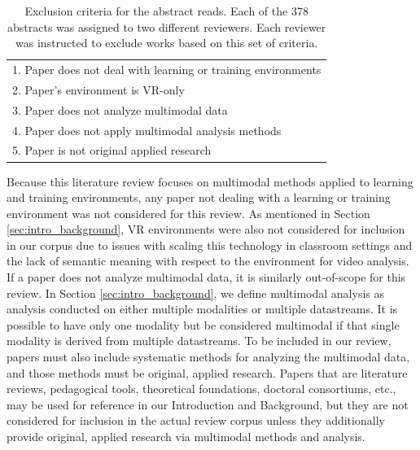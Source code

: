 \documentclass[manuscript,screen,review]{acmart}
\begin{document}
\begin{table}[htbp]
    \renewcommand{\arraystretch}{1.3}%
    \centering
    \caption{Exclusion criteria for the abstract reads. Each of the 378 abstracts was assigned to two different reviewers. Each reviewer was instructed to exclude works based on this set of criteria.}
    \begin{tabularx}{\linewidth}{l@{\hskip .25in}}
        \midrule
        1. Paper does not deal with learning or training environments \\
        2. Paper's environment is VR-only \\
        3. Paper does not analyze multimodal data \\
        4. Paper does not apply multimodal analysis methods \\
        5. Paper is not original applied research\\
        \bottomrule
    \end{tabularx}
    \label{tab:abstract_exclusion_criteria}
\end{table}

Because this literature review focuses on multimodal methods applied to learning and training environments, any paper not dealing with a learning or training environment was not considered for this review. As mentioned in Section \ref{sec:intro_background}, VR environments were also not considered for inclusion in our corpus due to issues with scaling this technology in classroom settings and the lack of semantic meaning with respect to the environment for video analysis. If a paper does not analyze multimodal data, it is similarly out-of-scope for this review. In Section \ref{sec:intro_background}, we define multimodal analysis as analysis conducted on either multiple modalities or multiple datastreams. It is possible to have only one modality but be considered multimodal if that single modality is derived from multiple datastreams. To be included in our review, papers must also include systematic methods for analyzing the multimodal data, and those methods must be original, applied research. Papers that are literature reviews, pedagogical tools, theoretical foundations, doctoral consortiums, etc., may be used for reference in our Introduction and Background, but they are not considered for inclusion in the actual review corpus unless they additionally provide original, applied research via multimodal methods and analysis.
\end{document}
